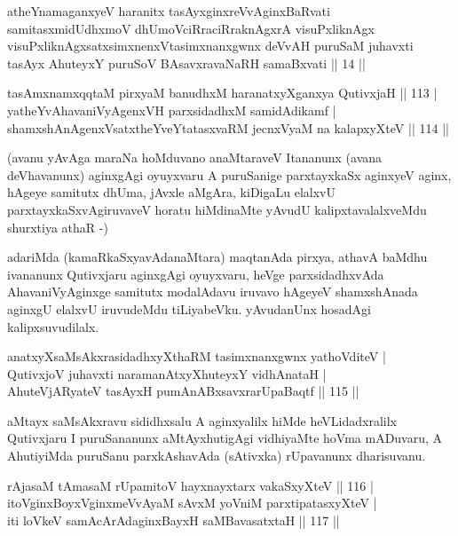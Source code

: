 
\begin{shl}
atheYnamaganxyeV haranitx tasAyxginxreVvAginxBaRvati samitasxmidUdhxmoV dhUmoV\s ciRraciRraknAgxrA visuPxliknAgx visuPxliknAgxsatxsimxnenxVtasimxnanxgwnx deVvAH puruSaM juhavxti tasAyx AhuteyxY puruSoV BAsavxravaNaRH samaBxvati || 14 ||
\end{shl}

\begin{shl}
tasAmxnamxqqtaM pirxyaM banudhxM haranatxyXganxya QutivxjaH \hfill|| 113 | \\
yatheYvA\s \s havaniVyAgenxVH parxsidadhxM samidAdikamf | \\
shamxshAnAgenxVsatxtheYveYtatasxvaRM jecnxVyaM na kalapxyXteV \hfill|| 114 || 
\end{shl}

\begin{artha}
(avanu yAvAga maraNa hoMduvano anaMtaraveV Itananunx (avana  deVhavanunx) aginxgAgi oyuyxvaru A puruSanige parxtayxkaSx aginxyeV aginx, hAgeye samitutx dhUma, jAvxle aMgAra, kiDigaLu elalxvU  parxtayxkaSxvAgiruvaveV horatu hiMdinaMte yAvudU kalipxtavalalxveMdu  shurxtiya athaR -)
\end{artha}


\begin{artha}
adariMda (kamaRkaSxyavAdanaMtara) maqtanAda pirxya, athavA baMdhu
ivananunx Qutivxjaru aginxgAgi oyuyxvaru, heVge parxsidadhxvAda
AhavaniVyAginxge samitutx modalAdavu iruvavo hAgeyeV shamxshAnada
aginxgU elalxvU iruvudeMdu tiLiyabeVku. yAvudanUnx hosadAgi
kalipxsuvudilalx.
\end{artha}

\begin{shl}
anatxyXsaMsAkxrasidadhxyXthaRM tasimxnanxgwnx yathoVditeV | \\
QutivxjoV juhavxti naramanAtxyXhuteyxY vidhAnataH | \\
AhuteVjARyateV tasAyxH pumAnABxsavxrarUpaBaqtf \hfill|| 115 || 
\end{shl}

\begin{artha}
aMtayx saMsAkxravu sididhxsalu A aginxyalilx hiMde heVLidadxralilx
Qutivxjaru I puruSananunx aMtAyxhutigAgi vidhiyaMte hoVma mADuvaru, A
AhutiyiMda puruSanu parxkAshavAda (sAtivxka) rUpavanunx dharisuvanu.
\end{artha}

\begin{shl}
rAjasaM tAmasaM rUpamitoV hayxnayxtarx vakaSxyXteV \hfill|| 116 | \\
itoV\s ginxBoyxV\s ginxmeVvAyaM sAvxM yoVniM parxtipatasxyXteV | \\
iti loVkeV samAcArAdaginxBayxH saMBavasatxtaH \hfill|| 117 || 
\end{shl}

